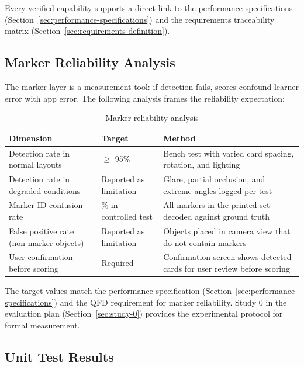\documentclass[10pt,a4paper]{article}
\begin{document}
Every verified capability supports a direct link to the performance
specifications (Section~\ref{sec:performance-specifications}) and the
requirements traceability matrix
(Section~\ref{sec:requirements-definition}).

\subsection{Marker Reliability Analysis}
\label{sec:marker-reliability-analysis}

The marker layer is a measurement tool: if detection fails, scores confound
learner error with app error. The following analysis frames the reliability
expectation:

\begin{table}[H]
\centering
\caption{Marker reliability analysis}
\label{tab:marker-reliability-analysis}
\small\renewcommand{\arraystretch}{1.2}\setlength{\tabcolsep}{4pt}
\begin{tabularx}{\textwidth}{|>{\raggedright\arraybackslash}X|>{\raggedright\arraybackslash}X|>{\raggedright\arraybackslash}X|}
\hline
Dimension & Target & Method \\
\hline
Detection rate in normal layouts & $\ge$ 95\% & Bench test with varied card spacing, rotation, and lighting \\
\hline
Detection rate in degraded conditions & Reported as limitation & Glare, partial occlusion, and extreme angles logged per test \\
\hline
Marker-ID confusion rate & 0\% in controlled test & All markers in the printed set decoded against ground truth \\
\hline
False positive rate (non-marker objects) & Reported as limitation & Objects placed in camera view that do not contain markers \\
\hline
User confirmation before scoring & Required & Confirmation screen shows detected cards for user review before scoring \\
\hline
\end{tabularx}
\end{table}

The target values match the performance specification
(Section~\ref{sec:performance-specifications}) and the QFD requirement
for marker reliability. Study 0 in the evaluation plan
(Section~\ref{sec:study-0}) provides the experimental protocol for formal
measurement.

\subsection{Unit Test Results}
\label{sec:unit-test-results}
\end{document}
